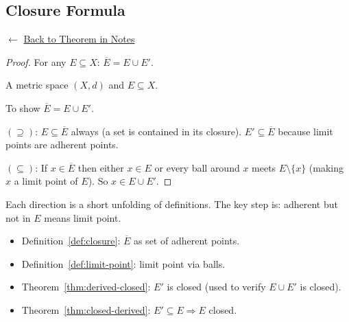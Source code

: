 
\subsection*{Closure Formula}
\label{prf:closure-formula}

\begin{remark*}[Return]
$\leftarrow$ \hyperref[thm:closure-formula]{Back to Theorem in Notes}
\end{remark*}

\begin{proof}
\Claim For any $E \subseteq X$: $\overline{E} = E \cup E'$.

\Given A metric space $(X,d)$ and $E \subseteq X$.

\Goal To show $\overline{E} = E \cup E'$.

\Strategy
$(\supseteq)$: $E \subseteq \overline{E}$ always (a set is contained in its closure).
$E' \subseteq \overline{E}$ because limit points are adherent points.

$(\subseteq)$: If $x \in \overline{E}$ then either $x \in E$ or every ball
around $x$ meets $E \setminus \{x\}$ (making $x$ a limit point of $E$).
So $x \in E \cup E'$.


\end{proof}

\begin{remark*}
Each direction is a short unfolding of definitions.
The key step is: adherent but not in $E$ means limit point.
\end{remark*}

\begin{remark*}[Dependencies]
\begin{itemize}
  \item Definition~\ref{def:closure}: $\overline{E}$ as set of adherent points.
  \item Definition~\ref{def:limit-point}: limit point via balls.
  \item Theorem~\ref{thm:derived-closed}: $E'$ is closed (used to verify $E \cup E'$ is closed).
  \item Theorem~\ref{thm:closed-derived}: $E' \subseteq E \Rightarrow E$ closed.
\end{itemize}
\end{remark*}
